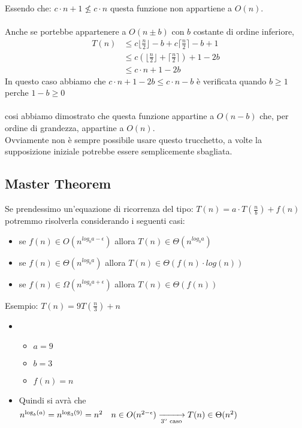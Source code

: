 \documentclass[a4paper,12pt]{article}
\begin{document}
Essendo che:  $c \cdot n + 1 \nleq  c \cdot n $  questa funzione non appartiene a $O(n)$. \\
\\
Anche se portebbe appartenere a $O(n \pm  b)$ con $b $ costante di ordine inferiore,
\begin{align*}
    T(n) &\le c \lfloor \frac{n}{2} \rfloor -b+ c \lceil \frac{n}{2} \rceil-b+ 1 \\
            &\le c( \lfloor \frac{n}{2} \rfloor + \lceil \frac{n}{2} \rceil) + 1 -2b \\
            &\le c \cdot n + 1 -2b
\end{align*}
In questo caso abbiamo che $c \cdot n + 1 -2b \leq c \cdot n - b$ è verificata quando $b \ge 1$ perche $1 - b \ge 0$ \\
\\ cosi abbiamo dimostrato che questa funzione appartine a $O(n - b)$ che, per ordine di grandezza, appartine a $O(n)$.\\
Ovviamente non è sempre possibile usare questo trucchetto, a volte la supposizione iniziale potrebbe essere semplicemente sbagliata.
\subsection{Master Theorem}
Se prendessimo un'equazione di ricorrenza del tipo: $ T(n) = a \cdot  T(\frac{n}{b}) + f(n) $ potremmo risolverla considerando i seguenti casi:
\begin{itemize}
    \item se $f(n) \in O(n^{log_{b} a - \epsilon})$ allora $T(n) \in \Theta(n^{log_{b} a})$
    \item se $f(n) \in \Theta(n^{log_{b} a})$ allora $T(n) \in \Theta(f(n)\cdot log(n))$
    \item se $f(n) \in \Omega(n^{log_{b} a + \epsilon})$ allora $T(n) \in \Theta(f(n))$
\end {itemize}

\textcolor{esempio}{Esempio:} $T(n) = 9T(\frac{n}{3}) + n$
\begin{itemize} [label={}]
     \item \begin{itemize}
        \item $a = 9$
        \item $b = 3$
        \item $f(n) = n$
        \end{itemize}
        \item Quindi si avrà che $n^{\log_{b}(a)}= n^{\log_{3}(9)} = n^{2} \quad n \in O(n^{2 - \epsilon})\xrightarrow[\text{3\textsuperscript{o} caso}]{\phantom{3\textsuperscript{o} caso}} T(n) \in \Theta(n^2)$
\end{itemize}
\end{document}
